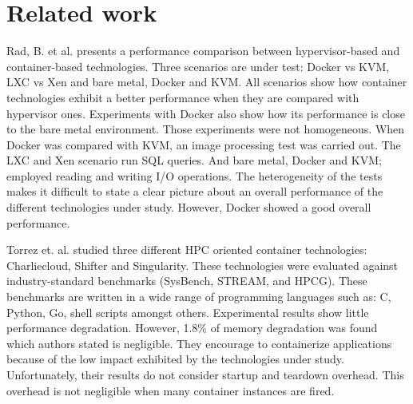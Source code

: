 \section{\label{sec:trabajo-relacionado} Related work}
Rad, B. et al. \cite{rad2017introduction} presents a performance comparison between hypervisor-based and container-based technologies. 
Three scenarios are under test: Docker vs KVM, LXC vs Xen and bare metal, Docker and KVM. 
All scenarios show how container technologies exhibit a better performance when they are compared with hypervisor ones. 
Experiments with Docker also show how its performance is close to the bare metal environment.
Those experiments were not homogeneous. 
When Docker was compared with KVM, an image processing test was carried out. 
The LXC and Xen scenario run SQL queries.
And bare metal, Docker and KVM; employed reading and writing I/O operations.
The heterogeneity of the tests makes it difficult to state a clear picture about an overall performance of the different technologies under study.
However, Docker showed a good overall performance.

Torrez et. al. \cite{torrez2019hpc} studied three different HPC oriented container technologies: Charliecloud, Shifter and Singularity.
These technologies were evaluated against industry-standard benchmarks (SysBench,  STREAM,  and  HPCG).
These benchmarks are written in a wide range of programming languages such as: C, Python, Go, shell scripts amongst others.
Experimental results show little performance degradation. 
However, 1.8\% of memory degradation was found which authors stated is negligible. 
They encourage to containerize applications because of the low impact exhibited by the technologies under study.
Unfortunately, their results do not consider startup and teardown overhead. 
This overhead is not negligible when many container instances are fired.
